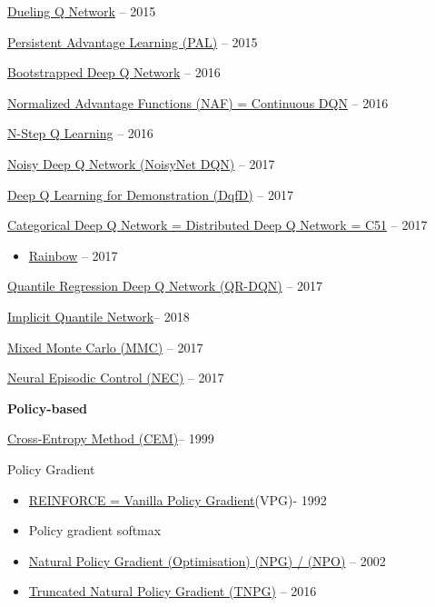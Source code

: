 \documentclass[
  a4paper,
  DIV=11,
  numbers=noendperiod]{scrreprt}
\providecommand{\tightlist}{%
  \setlength{\itemsep}{0pt}\setlength{\parskip}{0pt}}\usepackage{longtable,booktabs,array}
\begin{document}
\href{https://arxiv.org/abs/1511.06581}{Dueling Q Network} -- 2015

\href{https://arxiv.org/abs/1512.04860}{Persistent Advantage Learning
(PAL)} -- 2015

\href{https://arxiv.org/abs/1602.04621}{Bootstrapped Deep Q Network} --
2016

\href{https://arxiv.org/abs/1603.00748}{Normalized Advantage Functions
(NAF) = Continuous DQN} -- 2016

\href{https://arxiv.org/abs/1602.01783}{N-Step Q Learning} -- 2016

\href{https://arxiv.org/abs/1706.10295}{Noisy Deep Q Network (NoisyNet
DQN)} -- 2017

\href{https://arxiv.org/abs/1704.03732}{Deep Q Learning for
Demonstration (DqfD)} -- 2017

\href{https://arxiv.org/abs/1707.06887}{Categorical Deep Q Network =
Distributed Deep Q Network = C51} -- 2017

\begin{itemize}
\tightlist
\item
  \href{https://arxiv.org/abs/1710.02298}{Rainbow} -- 2017
\end{itemize}

\href{https://arxiv.org/pdf/1710.10044v1.pdf}{Quantile Regression Deep Q
Network (QR-DQN)} -- 2017

\href{https://arxiv.org/abs/1806.06923}{Implicit Quantile Network}--
2018

\href{https://arxiv.org/abs/1703.01310}{Mixed Monte Carlo (MMC)} -- 2017

\href{https://arxiv.org/abs/1703.01988}{Neural Episodic Control (NEC)}
-- 2017

\textbf{Policy-based}

\href{https://link.springer.com/article/10.1023/A:1010091220143}{Cross-Entropy
Method (CEM)}-- 1999

Policy Gradient

\begin{itemize}
\tightlist
\item
  \href{https://people.cs.umass.edu/~barto/courses/cs687/williams92simple.pdf}{REINFORCE
  = Vanilla Policy Gradient}(VPG)- 1992
\item
  Policy gradient softmax
\item
  \href{https://papers.nips.cc/paper/2073-a-natural-policy-gradient.pdf}{Natural
  Policy Gradient (Optimisation) (NPG) / (NPO)} -- 2002
\item
  \href{https://arxiv.org/abs/1604.06778}{Truncated Natural Policy
  Gradient (TNPG)} -- 2016
\end{itemize}
\end{document}
